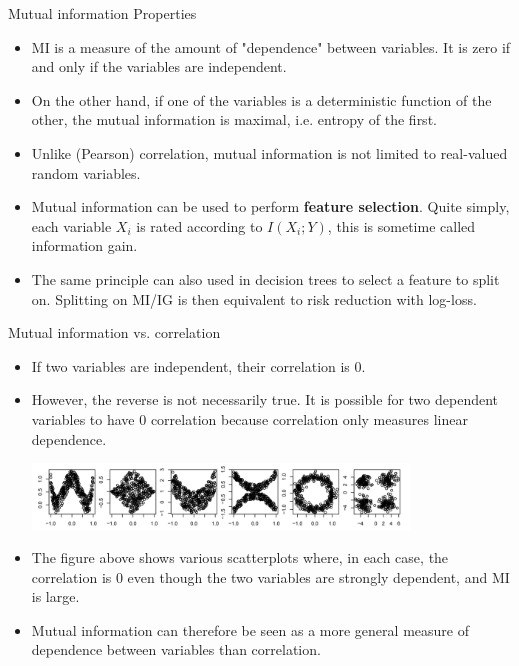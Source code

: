 \begin{vbframe} {Mutual information Properties}
\begin{itemize}
  \item MI is a measure of the amount of "dependence" between variables. It is zero if and only if the variables are independent.
  \item On the other hand, if one of the variables is a deterministic function of the other, the mutual information is maximal, i.e. entropy of the first.
 \item Unlike (Pearson) correlation, mutual information is not limited to real-valued random variables.
    \item Mutual information can be used to perform \textbf{feature selection}. Quite simply, each variable $X_i$ is rated according to $I(X_i;Y)$, this is sometime called information gain.
  \item The same principle can also used in decision trees to select a feature to split on. Splitting on MI/IG is then equivalent to risk reduction with log-loss. 
\end{itemize}
\end{vbframe}
 

\begin{vbframe} {Mutual information vs. correlation}
  
  \begin{itemize}
    \item If two variables are independent, their correlation is 0.
    \item However, the reverse is not necessarily true. It is possible for two dependent variables to have 0 correlation because correlation only measures linear dependence.
    
\begin{center}
\includegraphics[width = 10cm ]{figure_man/correlation.png} \\
\end{center}

    \item The figure above shows various scatterplots where, in each case, the correlation is 0 even though the two variables are strongly dependent, and MI is large. 
    \item Mutual information can therefore be seen as a more general measure of dependence between variables than correlation.
  \end{itemize}

\end{vbframe}

